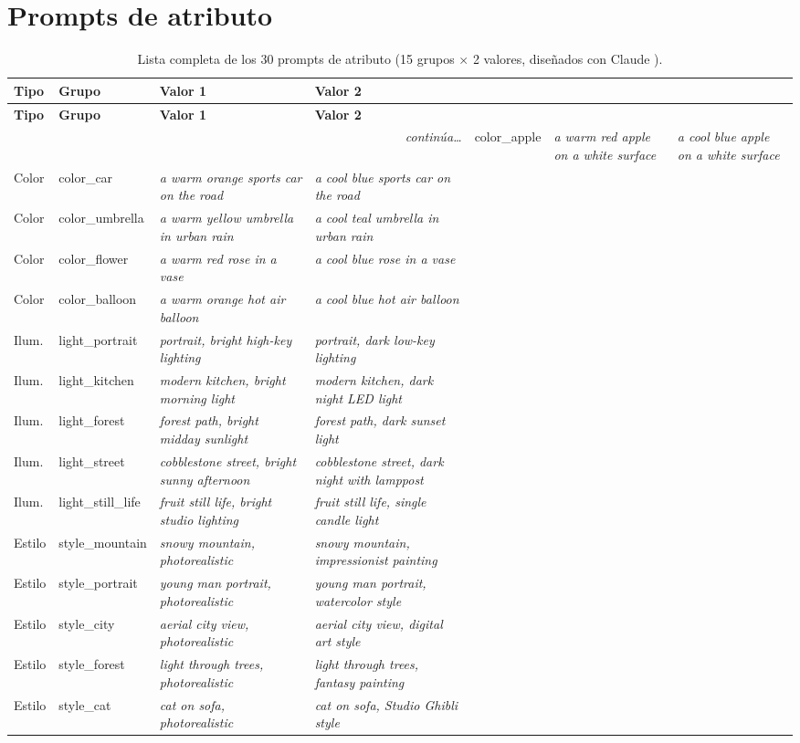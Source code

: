 \documentclass[12pt, a4paper, twoside]{book}
\begin{document}
\section{Prompts de atributo}

\begin{longtable}{llp{4.4cm}p{4.4cm}}
\caption{Lista completa de los 30 prompts de atributo (15 grupos $\times$ 2 valores, diseñados con Claude \citep{anthropic2024claude}).}
\label{tab:prompts_atributo} \\
\toprule
\textbf{Tipo} & \textbf{Grupo} & \textbf{Valor 1} & \textbf{Valor 2} \\
\midrule
\endfirsthead
\toprule \textbf{Tipo} & \textbf{Grupo} & \textbf{Valor 1} & \textbf{Valor 2} \\ \midrule
\endhead
\midrule \multicolumn{4}{r}{\small\textit{continúa\ldots}} \endfoot
\bottomrule \endlastfoot
Color & color\_apple & \textit{a warm red apple on a white surface} & \textit{a cool blue apple on a white surface} \\
Color & color\_car & \textit{a warm orange sports car on the road} & \textit{a cool blue sports car on the road} \\
Color & color\_umbrella & \textit{a warm yellow umbrella in urban rain} & \textit{a cool teal umbrella in urban rain} \\
Color & color\_flower & \textit{a warm red rose in a vase} & \textit{a cool blue rose in a vase} \\
Color & color\_balloon & \textit{a warm orange hot air balloon} & \textit{a cool blue hot air balloon} \\
Ilum. & light\_portrait & \textit{portrait, bright high-key lighting} & \textit{portrait, dark low-key lighting} \\
Ilum. & light\_kitchen & \textit{modern kitchen, bright morning light} & \textit{modern kitchen, dark night LED light} \\
Ilum. & light\_forest & \textit{forest path, bright midday sunlight} & \textit{forest path, dark sunset light} \\
Ilum. & light\_street & \textit{cobblestone street, bright sunny afternoon} & \textit{cobblestone street, dark night with lamppost} \\
Ilum. & light\_still\_life & \textit{fruit still life, bright studio lighting} & \textit{fruit still life, single candle light} \\
Estilo & style\_mountain & \textit{snowy mountain, photorealistic} & \textit{snowy mountain, impressionist painting} \\
Estilo & style\_portrait & \textit{young man portrait, photorealistic} & \textit{young man portrait, watercolor style} \\
Estilo & style\_city & \textit{aerial city view, photorealistic} & \textit{aerial city view, digital art style} \\
Estilo & style\_forest & \textit{light through trees, photorealistic} & \textit{light through trees, fantasy painting} \\
Estilo & style\_cat & \textit{cat on sofa, photorealistic} & \textit{cat on sofa, Studio Ghibli style} \\
\end{longtable}
\end{document}
